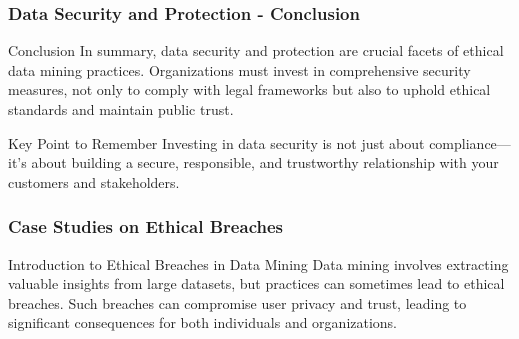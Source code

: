 \documentclass{beamer}
\begin{document}
\begin{frame}[fragile]
    \frametitle{Data Security and Protection - Conclusion}

    \begin{block}{Conclusion}
        In summary, data security and protection are crucial facets of ethical data mining practices. Organizations must invest in comprehensive security measures, not only to comply with legal frameworks but also to uphold ethical standards and maintain public trust.
    \end{block}

    \begin{block}{Key Point to Remember}
        Investing in data security is not just about compliance—it's about building a secure, responsible, and trustworthy relationship with your customers and stakeholders.
    \end{block}
\end{frame}

\begin{frame}[fragile]
    \frametitle{Case Studies on Ethical Breaches}
    \begin{block}{Introduction to Ethical Breaches in Data Mining}
        Data mining involves extracting valuable insights from large datasets, but practices can sometimes lead to ethical breaches. Such breaches can compromise user privacy and trust, leading to significant consequences for both individuals and organizations.
    \end{block}
\end{frame}
\end{document}
